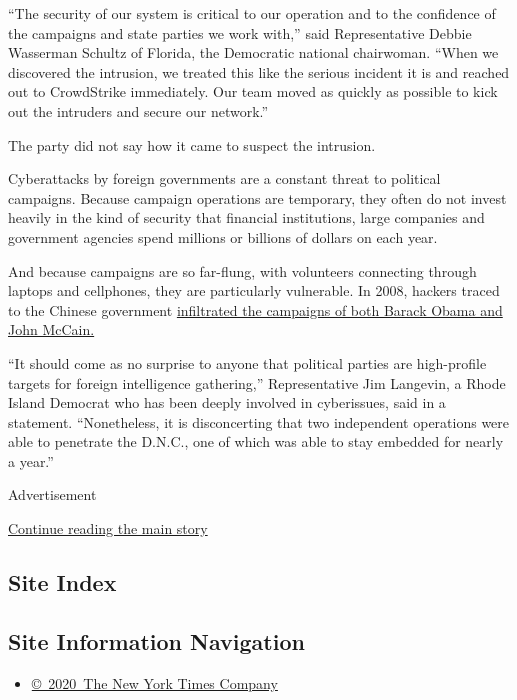 ``The security of our system is critical to our operation and to the
confidence of the campaigns and state parties we work with,'' said
Representative Debbie Wasserman Schultz of Florida, the Democratic
national chairwoman. ``When we discovered the intrusion, we treated this
like the serious incident it is and reached out to CrowdStrike
immediately. Our team moved as quickly as possible to kick out the
intruders and secure our network.''

The party did not say how it came to suspect the intrusion.

Cyberattacks by foreign governments are a constant threat to political
campaigns. Because campaign operations are temporary, they often do not
invest heavily in the kind of security that financial institutions,
large companies and government agencies spend millions or billions of
dollars on each year.

And because campaigns are so far-flung, with volunteers connecting
through laptops and cellphones, they are particularly vulnerable. In
2008, hackers traced to the Chinese government
\href{http://investigations.nbcnews.com/_news/2013/06/06/18807056-chinese-hacked-obama-mccain-campaigns-took-internal-documents-officials-say}{infiltrated
the campaigns of both Barack Obama and John McCain.}

``It should come as no surprise to anyone that political parties are
high-profile targets for foreign intelligence gathering,''
Representative Jim Langevin, a Rhode Island Democrat who has been deeply
involved in cyberissues, said in a statement. ``Nonetheless, it is
disconcerting that two independent operations were able to penetrate the
D.N.C., one of which was able to stay embedded for nearly a year.''

Advertisement

\protect\hyperlink{after-bottom}{Continue reading the main story}

\hypertarget{site-index}{%
\subsection{Site Index}\label{site-index}}

\hypertarget{site-information-navigation}{%
\subsection{Site Information
Navigation}\label{site-information-navigation}}

\begin{itemize}
\tightlist
\item
  \href{https://help.nytimes.com/hc/en-us/articles/115014792127-Copyright-notice}{©~2020~The
  New York Times Company}
\end{itemize}

